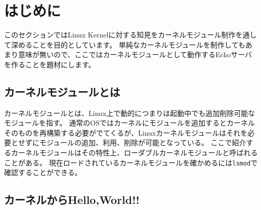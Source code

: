\section{はじめに}
このセクションではLinux Kernelに対する知見をカーネルモジュール制作を通して深めることを目的としています。
単純なカーネルモジュールを制作してもあまり意味が無いので、ここではカーネルモジュールとして動作するEchoサーバを作ることを題材にします。

\subsection{カーネルモジュールとは}
カーネルモジュールとは、Linux上で動的につまりは起動中でも追加削除可能なモジュールを指す。
通常のOSではカーネルにモジュールを追加するとカーネルそのものを再構築する必要がでてくるが、Linuxカーネルモジュールはそれを必要とせずにモジュールの追加、利用、削除が可能となっている。
ここで紹介するカーネルモジュールはその特性上、ローダブルカーネルモジュールと呼ばれることがある。
現在ロードされているカーネルモジュールを確かめるには\texttt{lsmod}で確認することができる。

\subsection{カーネルからHello,World!!}

\subsection{}
